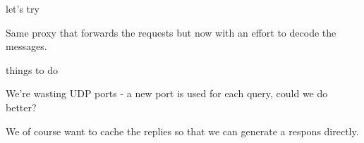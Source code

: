 \begin{frame}{let's try}

Same proxy that forwards the requests but now with an effort to decode the messages.

\end{frame}

\begin{frame}{things to do}

We're wasting UDP ports - a new port is used for each query, could we do better?

\vspace{20pt}\pause

We of course want to cache the replies so that we can generate a respons directly.



\end{frame}





